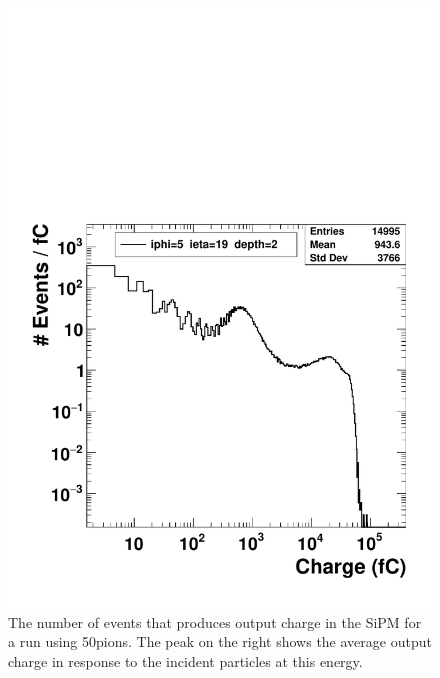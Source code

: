 \begin{figure}
\centering
\includegraphics[width=0.7\linewidth]{Figures/pioncharge.pdf}
\caption{The number of events that produces output charge in the SiPM for a run using 50\GeV\space pions. The peak on the right shows the average output charge in response to the incident particles at this energy.}
\label{fig:pioncharge}
\end{figure}

